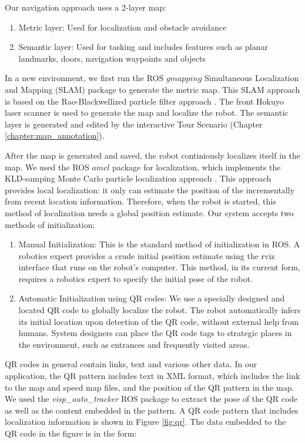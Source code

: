 Our navigation approach uses a 2-layer map:

\begin{enumerate}
\item Metric layer: Used for localization and obstacle avoidance
\item Semantic layer: Used for tasking and includes features such as planar landmarks, doors, navigation waypoints and objects
\end{enumerate}

In a new environment, we first run the ROS $gmapping$ Simultaneous Localization and Mapping (SLAM) package to generate the metric map. This SLAM approach is based on the Rao-Blackwellized particle filter approach \cite{grisetti2007improved}. The front Hokuyo laser scanner is used to generate the map and localize the robot. The semantic layer is generated and edited by the interactive Tour Scenario (Chapter \ref{chapter:map_annotation}).

After the map is generated and saved, the robot continiously localizes itself in the map. We used the ROS $amcl$ package for localization, which implements the KLD-samping Monte Carlo particle localization approach \cite{fox1999monte}. This approach provides local localization: it only can estimate the position of the incrementally from recent location information. Therefore, when the robot is started, this method of localization needs a global position estimate. Our system accepts two methods of initialization:

\begin{enumerate}
\item Manual Initialization: This is the standard method of initialization in ROS. A robotics expert provides a crude initial position estimate using the rviz interface that runs on the robot's computer. This method, in its current form, requires a robotics expert to specify the initial pose of the robot.
\item Automatic Initialization using QR codes: We use a specially designed and located QR code to globally localize the robot. The robot automatically infers its initial location upon detection of the QR code, without external help from humans. System designers can place the QR code tags to strategic places in the environment, such as entrances and frequently visited areas. 
\end{enumerate}

QR codes in general contain links, text and various other data. In our application, the QR pattern includes text in XML format, which includes the link to the map and speed map files, and the position of the QR pattern in the map. We used the \textit{visp\_auto\_tracker} ROS package to extract the pose of the QR code as well as the content embedded in the pattern. A QR code pattern that includes localization information is shown in Figure \ref{fig:qr}. The data embedded to the QR code in the figure is in the form:

